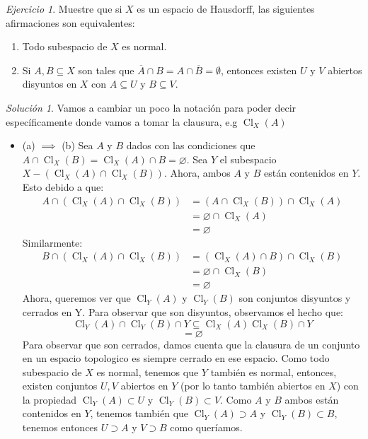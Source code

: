 \documentclass[notitlepage]{report}
\theoremstyle{definition}
\theoremstyle{remark}
\newtheorem{exc}{Ejercicio}
\newtheorem*{sol}{Solución}
\newcommand{\lrp}[1]{\left( #1 \right)}
\newcommand{\operatorclausure}[2]{\operatorname{Cl}_{#1}\lrp{#2}}
\begin{document}
\begin{exc}
	Muestre que si $ X $ es un espacio de Hausdorff, las siguientes afirmaciones son equivalentes:
\begin{enumerate}
	\item Todo subespacio de $ X $ es normal.
	\item Si $ A,B \subseteq X $ son tales que $ \overline{A}\cap B = A \cap \overline{B}=\emptyset $, entonces existen $ U $ y $ V $ abiertos disyuntos en $ X $ con $ A \subseteq U $ y $ B \subseteq V $.
	
\end{enumerate}

\end{exc}
\begin{sol}
	Vamos a cambiar un poco la notación para poder decir específicamente donde vamos a tomar la clausura, e.g $ \operatorclausure{X}{A} $
	
	\begin{itemize}
		\item 	(a) $ \implies  $ (b) Sea $ A $ y $ B $ dados con las condiciones que $ A \cap \operatorclausure{X}{B} = \operatorclausure{X}{A} \cap B = \varnothing $. Sea $ Y $ el subespacio $ X - \lrp{\operatorclausure{X}{A} \cap \operatorclausure{X}{B}} $. Ahora, ambos $ A $ y $ B $ están contenidos en $ Y $. Esto debido a que:
		\begin{align*}
		A \cap \lrp{\operatorclausure{X}{A} \cap \operatorclausure{X}{B}} &= \lrp{A \cap \operatorclausure{X}{B}} \cap \operatorclausure{X}{A} \\
		&= \varnothing \cap \operatorclausure{X}{A} \\
		&= \varnothing
		\end{align*}
		Similarmente:
		\begin{align*}
		B \cap \lrp{\operatorclausure{X}{A} \cap \operatorclausure{X}{B}} &= \lrp{\operatorclausure{X}{A} \cap B} \cap \operatorclausure{X}{B} \\
		&= \varnothing \cap \operatorclausure{X}{B} \\
		&= \varnothing
		\end{align*}
		Ahora, queremos ver que $ \operatorclausure{Y}{A} $ y $ \operatorclausure{Y}{B} $ son conjuntos disyuntos y cerrados en Y. Para observar que son disyuntos, observamos el hecho que:
		\[ \operatorclausure{Y}{A} \cap \operatorclausure{Y}{B} \cap Y \subseteq \operatorclausure{X}{A} \operatorclausure{X}{B} \cap Y \]
		\begin{equation}
		= \varnothing
		\end{equation}
		Para observar que son cerrados, damos cuenta que la clausura de un conjunto en un espacio topologico es siempre cerrado en ese espacio.
		Como todo subespacio de $ X $ es normal, tenemos que $ Y $ también es normal, entonces, existen conjuntos $ U,V $ abiertos en $ Y $ (por lo tanto también abiertos en $ X $) con la propiedad $ \operatorclausure{Y}{A} \subset U $ y $ \operatorclausure{Y}{B} \subset V $. Como $ A $ y $ B $ ambos están contenidos en $ Y $, tenemos también que $ \operatorclausure{Y}{A} \supset A $ y $ \operatorclausure{Y}{B} \subset B $, tenemos entonces $ U \supset A $ y $ V \supset B $ como queríamos.
		

\end{itemize}
\end{sol}
\end{document}
